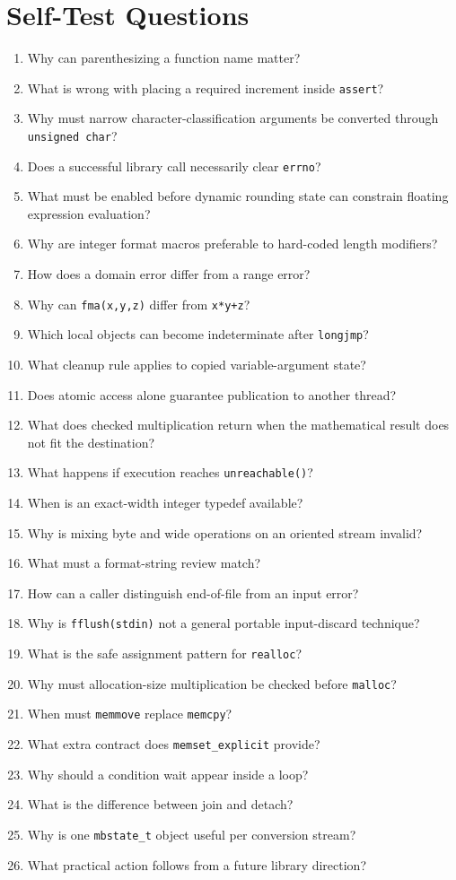 \documentclass[10pt,letterpaper]{article}
\begin{document}
\clearpage
\section{Self-Test Questions}
\begin{enumerate}
  \item Why can parenthesizing a function name matter?
  \item What is wrong with placing a required increment inside \texttt{assert}?
  \item Why must narrow character-classification arguments be converted through \texttt{unsigned char}?
  \item Does a successful library call necessarily clear \texttt{errno}?
  \item What must be enabled before dynamic rounding state can constrain floating expression evaluation?
  \item Why are integer format macros preferable to hard-coded length modifiers?
  \item How does a domain error differ from a range error?
  \item Why can \texttt{fma(x,y,z)} differ from \texttt{x*y+z}?
  \item Which local objects can become indeterminate after \texttt{longjmp}?
  \item What cleanup rule applies to copied variable-argument state?
  \item Does atomic access alone guarantee publication to another thread?
  \item What does checked multiplication return when the mathematical result does not fit the destination?
  \item What happens if execution reaches \texttt{unreachable()}?
  \item When is an exact-width integer typedef available?
  \item Why is mixing byte and wide operations on an oriented stream invalid?
  \item What must a format-string review match?
  \item How can a caller distinguish end-of-file from an input error?
  \item Why is \texttt{fflush(stdin)} not a general portable input-discard technique?
  \item What is the safe assignment pattern for \texttt{realloc}?
  \item Why must allocation-size multiplication be checked before \texttt{malloc}?
  \item When must \texttt{memmove} replace \texttt{memcpy}?
  \item What extra contract does \texttt{memset\_explicit} provide?
  \item Why should a condition wait appear inside a loop?
  \item What is the difference between join and detach?
  \item Why is one \texttt{mbstate\_t} object useful per conversion stream?
  \item What practical action follows from a future library direction?
\end{enumerate}
\end{document}
